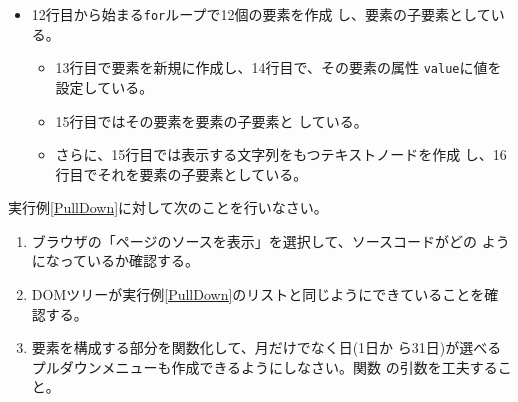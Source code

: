 \begin{Exec}
\begin{itemize}
 \item 12行目から始まる\texttt{for}ループで12個の要素を作成
       し、要素の子要素としている。
       \begin{itemize}
	\item 13行目で要素を新規に作成し、14行目で、その要素の属性
        \texttt{value}に値を設定している。
	\item 15行目ではその要素を要素の子要素と
	      している。
	\item さらに、15行目では表示する文字列をもつテキストノードを作成
	      し、16行目でそれを要素の子要素としている。
       \end{itemize}
\end{itemize}
\end{Exec}
\begin{Prob}\upshape
実行例\ref{PullDown}に対して次のことを行いなさい。
\begin{enumerate}
 \item ブラウザの「ページのソースを表示」を選択して、ソースコードがどの
       ようになっているか確認する。
 \item DOMツリーが実行例\ref{PullDown}のリストと同じようにできていることを確認する。
 \item {}要素を構成する部分を関数化して、月だけでなく日(1日か
       ら31日)が選べるプルダウンメニューも作成できるようにしなさい。関数
       の引数を工夫すること。
\end{enumerate}
\end{Prob}
